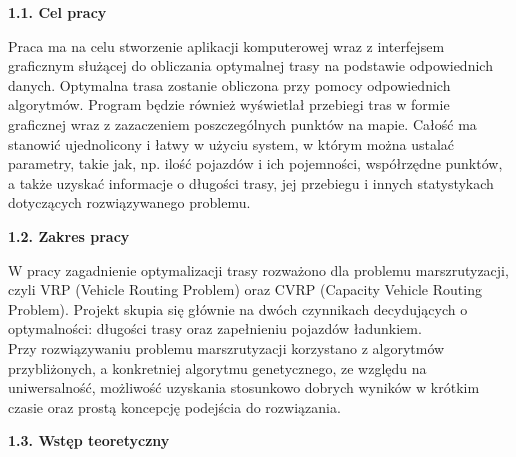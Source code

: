 \documentclass[a4paper, twoside, 12pt, justified]{article}
\begin{document}
	\begin{flushleft}
		\begin{large}
			\textbf{1.1. Cel pracy}
		\end{large}
	\end{flushleft}
	\vspace{5mm} %
	
	Praca ma na celu stworzenie aplikacji komputerowej wraz z interfejsem graficznym służącej do obliczania optymalnej trasy na podstawie odpowiednich danych. Optymalna trasa zostanie obliczona przy pomocy odpowiednich algorytmów. Program będzie również wyświetlał przebiegi tras w formie graficznej wraz z zazaczeniem poszczególnych punktów na mapie. Całość ma stanowić ujednolicony i łatwy w użyciu system, w którym można ustalać parametry, takie jak, np. ilość pojazdów i ich pojemności, współrzędne punktów, a także uzyskać informacje o długości trasy, jej przebiegu i innych statystykach dotyczących rozwiązywanego problemu.  
	\vspace{5mm} %
	
	\begin{flushleft}
		\begin{large}
			\textbf{1.2. Zakres pracy}
		\end{large}
	\end{flushleft}
	\vspace{5mm} %
	
	W pracy zagadnienie optymalizacji trasy rozważono dla problemu marszrutyzacji, czyli VRP (Vehicle Routing Problem) oraz CVRP (Capacity Vehicle Routing Problem). Projekt skupia się głównie na dwóch czynnikach decydujących o optymalności: długości trasy oraz zapełnieniu pojazdów ładunkiem. \\
	Przy rozwiązywaniu problemu marszrutyzacji korzystano z algorytmów przybliżonych, a konkretniej algorytmu genetycznego, ze względu na uniwersalność, możliwość uzyskania stosunkowo dobrych wyników w krótkim czasie oraz prostą koncepcję podejścia do rozwiązania. \\
	
	
	\newpage
	\begin{flushleft}
		\begin{large}
			\textbf{1.3. Wstęp teoretyczny}
		\end{large}
	\end{flushleft}
	\vspace{5mm} %
\end{document}
